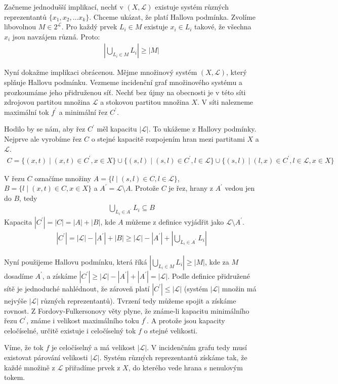 \begin{t_proof}
  Začneme jednodušší implikací, nechť v $(X,\mathcal{L})$ existuje systém různých reprezentantů $\{x_1,x_2,\dots x_k\}$. Chceme ukázat, že platí Hallova podmínka. Zvolíme libovolnou $M\in2^\mathcal{L}$. Pro každý prvek $L_i\in M$ existuje $x_i\in L_i$ takové, že všechna $x_i$ jsou navzájem různá. Proto:
  \begin{align*}
    \left|\bigcup_{L_i\in M} L_i\right|\geq |M|
  \end{align*}
  
  Nyní dokažme implikaci obrácenou. Mějme množinový systém $(X,\mathcal{L})$, který splňuje Hallovu podmínku. Vezmeme incidenční graf množinového systému a prozkoumáme jeho přidruženou síť. Nechť bez újmy na obecnosti je v této síti zdrojovou partitou množina $\mathcal{L}$ a stokovou partitou množina $X$. V síti nalezneme maximální tok $f^\prime$ a minimální řez $C^\prime$.
  
  Hodilo by se nám, aby řez $C^\prime$ měl kapacitu $|\mathcal{L}|$. To ukážeme z Hallovy podmínky. Nejprve ale vyrobíme řez $C$ o stejné kapacitě rozpojením hran mezi partitami $X$ a $\mathcal{L}$.
  \begin{align*}
    C=\{(x,t)\mid (x,t)\in C^\prime,x\in X\}\cup\{(s,l)\mid (s,l)\in C^\prime,l\in\mathcal{L}\}\cup\{(s,l)\mid (l,x)\in C^\prime,l\in\mathcal{L},x\in X\}
  \end{align*}
  
  V řezu $C$ označíme množiny $A=\{l\mid (s,l)\in C, l\in\mathcal{L}\}$, $B=\{l\mid (x,t)\in C, x\in X\}$ a $A^\prime=\mathcal{L}\setminus A$. Protože $C$ je řez, hrany z $A^\prime$ vedou jen do $B$, tedy
  \begin{align*}
    \bigcup_{L_i\in A^\prime}L_i\subseteq B
  \end{align*}
  Kapacita $|C^\prime|=|C|=|A|+|B|$, kde $A$ můžeme z definice vyjádřit jako $\mathcal{L}\setminus A^\prime$.
  \begin{align*}
    |C^\prime|=|\mathcal{L}|-|A^\prime|+|B|\geq |\mathcal{L}|-|A^\prime|+\left|\bigcup_{L_i\in A^\prime}L_i\right|
  \end{align*}
  
  Nyní použijeme Hallovu podmínku, která říká $\left|\bigcup_{L_i\in M} L_i\right|\geq |M|$, kde za $M$ dosadíme $A^\prime$, a získáme $|C^\prime|\geq |\mathcal{L}|-|A^\prime|+|A^\prime|=|\mathcal{L}|$. Podle definice přidružené sítě je jednoduché nahlédnout, že zároveň platí $|C^\prime|\leq|\mathcal{L}|$ (systém $|\mathcal{L}|$ množin má nejvýše $|\mathcal{L}|$ různých reprezentantů). Tvrzení tedy můžeme spojit a získáme rovnost. Z Fordovy-Fulkersonovy věty plyne, že známe-li kapacitu minimálního řezu $C^\prime$, známe i velikost maximálního toku $f^\prime$. A protože jsou kapacity celočíselné, určitě existuje i celočíselný tok $f$ o stejné velikosti.
  
  Víme, že tok $f$ je celočíselný a má velikost $|\mathcal{L}|$. V incidenčním grafu tedy musí existovat párování velikosti $|\mathcal{L}|$. Systém různých reprezentantů získáme tak, že každé množině z $\mathcal{L}$ přiřadíme prvek z $X$, do kterého vede hrana s nenulovým tokem.
\end{t_proof}

